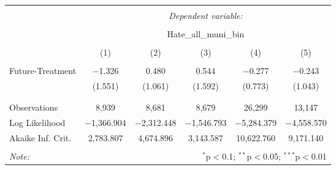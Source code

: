 
\begin{table}[!htbp] \centering 
  \caption{} 
  \label{} 
\begin{tabular}{@{\extracolsep{5pt}}lccccc} 
\\[-1.8ex]\hline 
\hline \\[-1.8ex] 
 & \multicolumn{5}{c}{\textit{Dependent variable:}} \\ 
\cline{2-6} 
\\[-1.8ex] & \multicolumn{5}{c}{Hate\_all\_muni\_bin} \\ 
\\[-1.8ex] & (1) & (2) & (3) & (4) & (5)\\ 
\hline \\[-1.8ex] 
 Future-Treatment & $-$1.326 & 0.480 & 0.544 & $-$0.277 & $-$0.243 \\ 
  & (1.551) & (1.061) & (1.592) & (0.773) & (1.043) \\ 
  & & & & & \\ 
\hline \\[-1.8ex] 
Observations & 8,939 & 8,681 & 8,679 & 26,299 & 13,147 \\ 
Log Likelihood & $-$1,366.904 & $-$2,312.448 & $-$1,546.793 & $-$5,284.379 & $-$4,558.570 \\ 
Akaike Inf. Crit. & 2,783.807 & 4,674.896 & 3,143.587 & 10,622.760 & 9,171.140 \\ 
\hline 
\hline \\[-1.8ex] 
\textit{Note:}  & \multicolumn{5}{r}{$^{*}$p$<$0.1; $^{**}$p$<$0.05; $^{***}$p$<$0.01} \\ 
\end{tabular} 
\end{table} 
